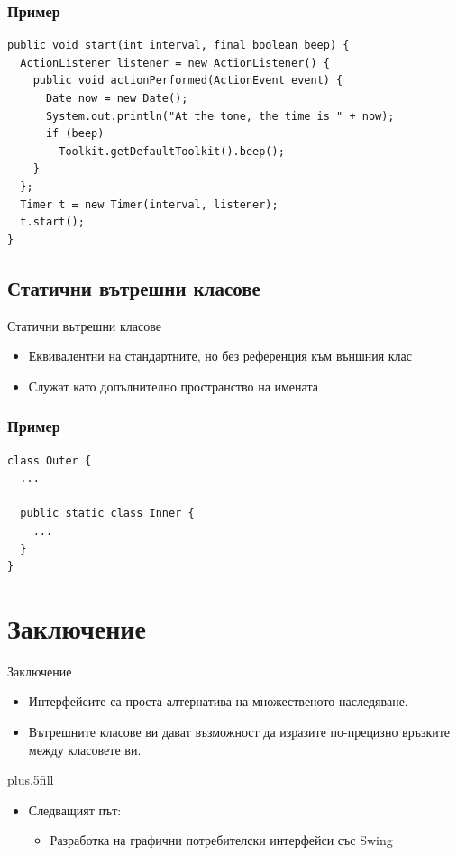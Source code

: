 \documentclass{beamer}
\begin{document}
\begin{frame}[fragile]
  \frametitle{Пример}
  \transdissolve
\begin{lstlisting}[basicstyle=\small]
public void start(int interval, final boolean beep) {
  ActionListener listener = new ActionListener() {
    public void actionPerformed(ActionEvent event) {
      Date now = new Date();
      System.out.println("At the tone, the time is " + now);
      if (beep) 
        Toolkit.getDefaultToolkit().beep();
    }
  };
  Timer t = new Timer(interval, listener);
  t.start();
} 
\end{lstlisting}
\end{frame}

\subsection{Статични вътрешни класове}
\begin{frame}{Статични вътрешни класове}
  \transdissolve
  \begin{itemize}
  \item Еквивалентни на стандартните, но без референция към външния
    клас  \pause
  \item Служат като допълнително пространство на имената
  \end{itemize}
\end{frame}

\begin{frame}[fragile]
  \frametitle{Пример}
  \transdissolve
\begin{lstlisting}
class Outer {
  ...

  public static class Inner {
    ...
  }
}  
\end{lstlisting}
\end{frame}

\section*{Заключение}
\begin{frame}{Заключение}
  \transdissolve
  \begin{itemize}
  \item
    Интерфейсите са проста алтернатива на множественото наследяване.
  \item
    Вътрешните класове ви дават възможност да изразите по-прецизно
    връзките между класовете ви.
  \end{itemize}
  
  \vskip0pt plus.5fill
  \begin{itemize}
  \item
    Следващият път:
    \begin{itemize}
    \item
      Разработка на графични потребителски интерфейси със Swing
    \end{itemize}
  \end{itemize}
\end{frame}
\end{document}

